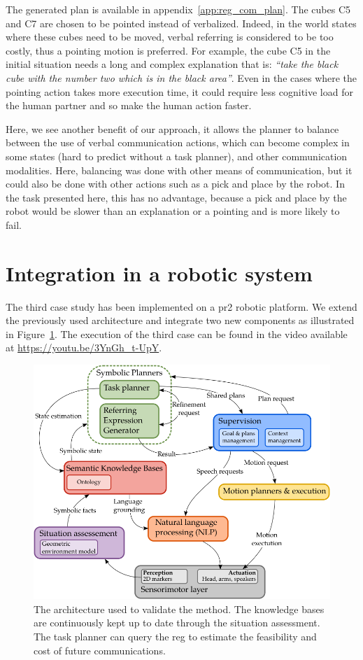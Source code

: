 The generated plan is available in appendix~\ref{app:reg_com_plan}. The cubes C5 and C7 are chosen to be pointed instead of verbalized. Indeed, in the world states where these cubes need to be moved, verbal referring is considered to be too costly, thus a pointing motion is preferred. For example, the cube C5 in the initial situation needs a long and complex explanation that is: \textit{``take the black cube with the number two which is in the black area''}. Even in the cases where the pointing action takes more execution time, it could require less cognitive load for the human partner and so make the human action faster.

Here, we see another benefit of our approach, it allows the planner to balance between the use of verbal communication actions, which can become complex in some states (hard to predict without a task planner), and other communication modalities. Here, balancing was done with other means of communication, but it could also be done with other actions such as a pick and place by the robot. In the task presented here, this has no advantage, because a pick and place by the robot would be slower than an explanation or a pointing and is more likely to fail.

\section{Integration in a robotic system}

The third case study has been implemented on a pr2 robotic platform. We extend the previously used architecture and integrate two new components as illustrated in Figure~\ref{fig:chap5_archi}. The execution of the third case can be found in the video available at \url{https://youtu.be/3YnGh_t-UpY}.

\begin{figure}[!ht]
\centering
\includegraphics[scale=0.6]{figures/chapter5/architecture.png}
\caption{\label{fig:chap5_archi} The architecture used to validate the method. The knowledge bases are continuously kept up to date through the situation assessment. The task planner can query the \acrshort{reg} to estimate the feasibility and cost of future communications. }
\end{figure}

